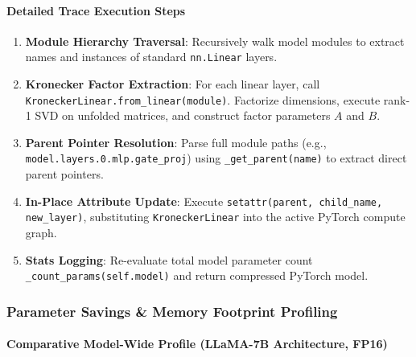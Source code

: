 \paragraph{Detailed Trace Execution Steps}
\begin{enumerate}
\item \textbf{Module Hierarchy Traversal}: Recursively walk model modules to extract names and instances of standard \texttt{nn.Linear} layers.
\item \textbf{Kronecker Factor Extraction}: For each linear layer, call \texttt{KroneckerLinear.from\_linear(module)}. Factorize dimensions, execute rank-1 SVD on unfolded matrices, and construct factor parameters $A$ and $B$.
\item \textbf{Parent Pointer Resolution}: Parse full module paths (e.g., \texttt{model.layers.0.mlp.gate\_proj}) using \texttt{\_get\_parent(name)} to extract direct parent pointers.
\item \textbf{In-Place Attribute Update}: Execute \texttt{setattr(parent, child\_name, new\_layer)}, substituting \texttt{KroneckerLinear} into the active PyTorch compute graph.
\item \textbf{Stats Logging}: Re-evaluate total model parameter count \texttt{\_count\_params(self.model)} and return compressed PyTorch model.


\end{enumerate}
\subsubsection*{Parameter Savings \& Memory Footprint Profiling}

\paragraph{Comparative Model-Wide Profile (LLaMA-7B Architecture, FP16)}

